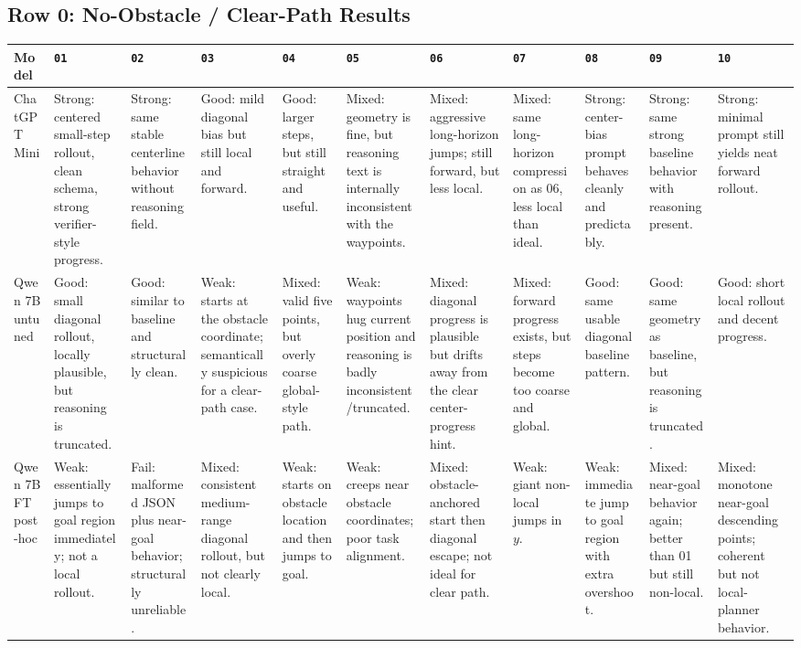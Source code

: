 \documentclass[10pt]{article}
\newcommand{\code}[1]{\texttt{#1}}
\begin{document}
\begin{landscape}
\section*{Row 0: No-Obstacle / Clear-Path Results}
\renewcommand{\arraystretch}{1.25}
\begin{longtable}{p{2.6cm}p{2.35cm}p{2.35cm}p{2.35cm}p{2.35cm}p{2.35cm}p{2.35cm}p{2.35cm}p{2.35cm}p{2.35cm}p{2.35cm}}
\toprule
Model & \code{01} & \code{02} & \code{03} & \code{04} & \code{05} & \code{06} & \code{07} & \code{08} & \code{09} & \code{10} \\
\midrule
\endhead
ChatGPT Mini &
Strong: centered small-step rollout, clean schema, strong verifier-style progress. &
Strong: same stable centerline behavior without reasoning field. &
Good: mild diagonal bias but still local and forward. &
Good: larger steps, but still straight and useful. &
Mixed: geometry is fine, but reasoning text is internally inconsistent with the waypoints. &
Mixed: aggressive long-horizon jumps; still forward, but less local. &
Mixed: same long-horizon compression as 06, less local than ideal. &
Strong: center-bias prompt behaves cleanly and predictably. &
Strong: same strong baseline behavior with reasoning present. &
Strong: minimal prompt still yields neat forward rollout. \\

Qwen 7B untuned &
Good: small diagonal rollout, locally plausible, but reasoning is truncated. &
Good: similar to baseline and structurally clean. &
Weak: starts at the obstacle coordinate; semantically suspicious for a clear-path case. &
Mixed: valid five points, but overly coarse global-style path. &
Weak: waypoints hug current position and reasoning is badly inconsistent/truncated. &
Mixed: diagonal progress is plausible but drifts away from the clear center-progress hint. &
Mixed: forward progress exists, but steps become too coarse and global. &
Good: same usable diagonal baseline pattern. &
Good: same geometry as baseline, but reasoning is truncated. &
Good: short local rollout and decent progress. \\

Qwen 7B FT post-hoc &
Weak: essentially jumps to goal region immediately; not a local rollout. &
Fail: malformed JSON plus near-goal behavior; structurally unreliable. &
Mixed: consistent medium-range diagonal rollout, but not clearly local. &
Weak: starts on obstacle location and then jumps to goal. &
Weak: creeps near obstacle coordinates; poor task alignment. &
Mixed: obstacle-anchored start then diagonal escape; not ideal for clear path. &
Weak: giant non-local jumps in \(y\). &
Weak: immediate jump to goal region with extra overshoot. &
Mixed: near-goal behavior again; better than 01 but still non-local. &
Mixed: monotone near-goal descending points; coherent but not local-planner behavior. \\


\end{longtable}
\end{landscape}
\end{document}
